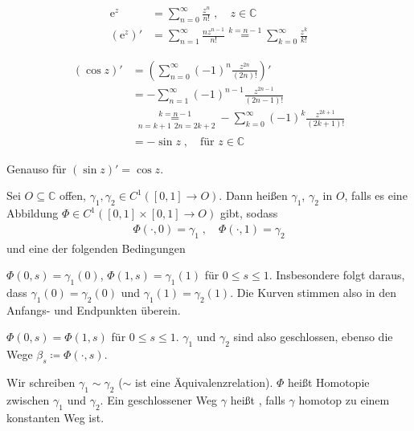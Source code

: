 \documentclass[a4paper,10pt]{scrbook}
\begin{document}

\begin{example}
  \begin{enum-arab}
    \item
    \begin{align*}
      \mathrm{e}^z &= \sum\limits_{n=0}^{\infty} \frac{z^n}{n!} \; , \quad z \in \mathbb{C} \\
      (\mathrm{e}^z)' &= \sum\limits_{n=1}^{\infty} \frac{n z^{n-1}}{n!} \overset{k = n-1}{=}
        \sum\limits_{k=0}^{\infty} \frac{z^k}{k!}
    \end{align*}

    \item
    \begin{align*}
      (\cos z)'
      &= \left( \sum\limits_{n=0}^{\infty} (-1)^n \frac{z^{2n}}{(2n)!} \right)' \\
      &= - \sum\limits_{n=1}^{\infty} (-1)^{n-1} \frac{z^{2n-1}}{(2n-1)!} \\
      &\overset{k=n-1}{\underset{\substack{n=k+1}{2n = 2k+2}}{=}}
      - \sum\limits_{k=0}^{\infty} (-1)^{k} \frac{z^{2k+1}}{(2k+1)!} \\
      &= - \sin z \; , \quad \text{für } z \in \mathbb{C}
    \end{align*}

    \item Genauso für $(\sin z)' = \cos z$.
  \end{enum-arab}
\end{example}

\begin{theorem}[Definition]
  Sei $O \subseteq \mathbb{C}$ offen, $\gamma_1, \gamma_2 \in C^1([0,1] \to O)$. Dann heißen $\gamma_1$, $\gamma_2$  in $O$, falls es eine Abbildung $\Phi \in C^1([0,1] \times [0,1] \to O)$ gibt, sodass
  \begin{align*}
    \Phi(\cdot,0) = \gamma_1 \; , \quad \Phi(\cdot,1) = \gamma_2
  \end{align*}
  und eine der folgenden Bedingungen
  \begin{enum-roman}
    \item $\Phi(0,s) = \gamma_1(0)$, $\Phi(1,s) = \gamma_1(1)$ für $0 \leq s \leq 1$. Insbesondere folgt daraus, dass $\gamma_1(0) = \gamma_2(0)$ und $\gamma_1(1) = \gamma_2(1)$. Die Kurven stimmen also in den Anfangs- und Endpunkten überein.

    \item $\Phi(0,s) = \Phi(1,s)$ für $0 \leq s \leq 1$. $\gamma_1$ und $\gamma_2$ sind also geschlossen, ebenso die Wege $\beta_s \coloneq \Phi(\cdot,s)$.
  \end{enum-roman}
  Wir schreiben $\gamma_1 \sim \gamma_2$ ($\sim$ ist eine Äquivalenzrelation). $\Phi$ heißt Homotopie zwischen $\gamma_1$ und $\gamma_2$. Ein geschlossener Weg $\gamma$ heißt , falls $\gamma$ homotop zu einem konstanten Weg ist.
\end{theorem}
\end{document}
